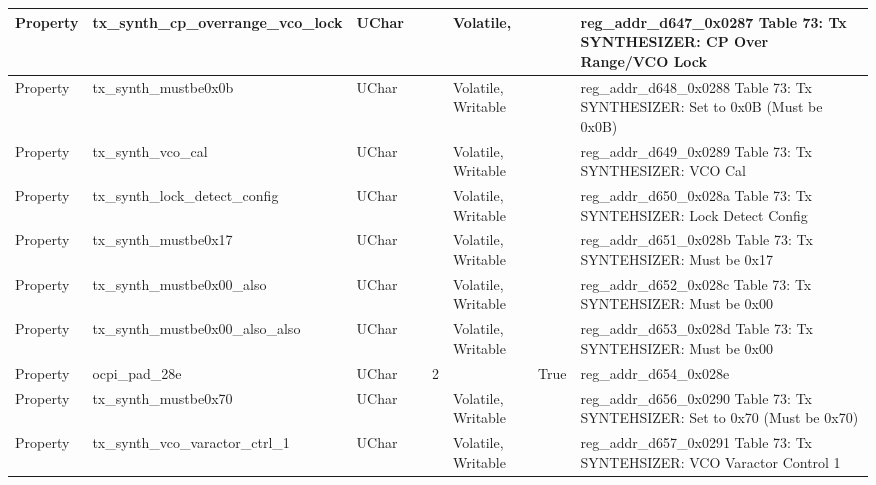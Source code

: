 \documentclass{article}
\begin{document}
\begin{scriptsize}
\begin{longtable}{|p{2cm}|p{5cm}|p{1cm}|p{2cm}|p{2cm}|p{1.75cm}|p{1.5cm}|p{5.1cm}|}
  \hline
  Property & tx\_synth\_cp\_overrange\_vco\_lock                      & UChar &                  &                  & Volatile,           &         & reg\_addr\_d647\_0x0287 Table 73: Tx SYNTHESIZER: CP Over Range/VCO Lock \\
  \hline
  Property & tx\_synth\_mustbe0x0b                                    & UChar &                  &                  & Volatile,  Writable &         & reg\_addr\_d648\_0x0288 Table 73: Tx SYNTHESIZER: Set to 0x0B (Must be 0x0B) \\
  \hline
  Property & tx\_synth\_vco\_cal                                      & UChar &                  &                  & Volatile,  Writable &         & reg\_addr\_d649\_0x0289 Table 73: Tx SYNTHESIZER: VCO Cal \\
  \hline
  Property & tx\_synth\_lock\_detect\_config                          & UChar &                  &                  & Volatile,  Writable &         & reg\_addr\_d650\_0x028a Table 73: Tx SYNTEHSIZER: Lock Detect Config \\
  \hline
  Property & tx\_synth\_mustbe0x17                                    & UChar &                  &                  & Volatile,  Writable &         & reg\_addr\_d651\_0x028b Table 73: Tx SYNTEHSIZER: Must be 0x17 \\
  \hline
  Property & tx\_synth\_mustbe0x00\_also                              & UChar &                  &                  & Volatile,  Writable &         & reg\_addr\_d652\_0x028c Table 73: Tx SYNTEHSIZER: Must be 0x00 \\
  \hline
  Property & tx\_synth\_mustbe0x00\_also\_also                        & UChar &                  &                  & Volatile,  Writable &         & reg\_addr\_d653\_0x028d Table 73: Tx SYNTEHSIZER: Must be 0x00 \\
  \hline
  Property & ocpi\_pad\_28e                                           & UChar &                  & 2                &                     & True    & reg\_addr\_d654\_0x028e \\
  \hline
  Property & tx\_synth\_mustbe0x70                                    & UChar &                  &                  & Volatile,  Writable &         & reg\_addr\_d656\_0x0290 Table 73: Tx SYNTEHSIZER: Set to 0x70 (Must be 0x70) \\
  \hline
  Property & tx\_synth\_vco\_varactor\_ctrl\_1                        & UChar &                  &                  & Volatile,  Writable &         & reg\_addr\_d657\_0x0291 Table 73: Tx SYNTEHSIZER: VCO Varactor Control 1 \\

\end{longtable}
\end{scriptsize}
\end{document}
